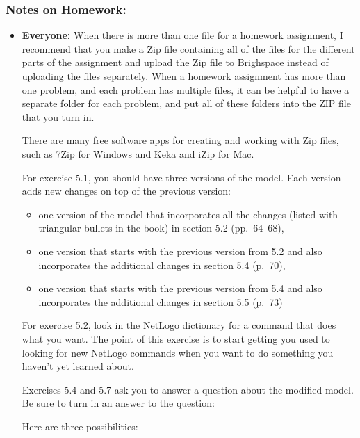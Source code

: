 \documentclass[
]{article}
\providecommand{\tightlist}{%
  \setlength{\itemsep}{0pt}\setlength{\parskip}{0pt}}
\begin{document}
\subsubsection{Notes on Homework:}\label{notes-on-homework-2}

\begin{itemize}
\item
  \textbf{Everyone:} When there is more than one file for a homework
  assignment, I recommend that you make a Zip file containing all of the
  files for the different parts of the assignment and upload the Zip
  file to Brighspace instead of uploading the files separately. When a
  homework assignment has more than one problem, and each problem has
  multiple files, it can be helpful to have a separate folder for each
  problem, and put all of these folders into the ZIP file that you turn
  in.

  There are many free software apps for creating and working with Zip
  files, such as \href{https://www.7-zip.org/}{7Zip} for Windows and
  \href{https://www.keka.io/en/}{Keka} and
  \href{https://www.izip.com}{iZip} for Mac.

  For exercise 5.1, you should have three versions of the model. Each
  version adds new changes on top of the previous version:

  \begin{itemize}
  \tightlist
  \item
    one version of the model that incorporates all the changes (listed
    with triangular bullets in the book) in section 5.2 (pp.~64--68),
  \item
    one version that starts with the previous version from 5.2 and also
    incorporates the additional changes in section 5.4 (p.~70),
  \item
    one version that starts with the previous version from 5.4 and also
    incorporates the additional changes in section 5.5 (p.~73)
  \end{itemize}

  For exercise 5.2, look in the NetLogo dictionary for a command that
  does what you want. The point of this exercise is to start getting you
  used to looking for new NetLogo commands when you want to do something
  you haven't yet learned about.

  Exercises 5.4 and 5.7 ask you to answer a question about the modified
  model. Be sure to turn in an answer to the question:

  Here are three possibilities:


\end{itemize}
\end{document}
